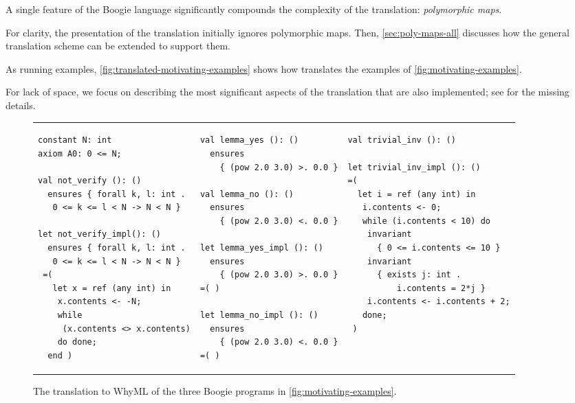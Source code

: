 \documentclass[a4paper,final]{llncs}
\newif\iflong
\newcommand{\Boogie}{Boogie\xspace}
\newcommand{\WhyML}{WhyML\xspace}
\newcommand{\Why}{Why3\xspace}
\begin{document}
A single feature of the \Boogie language significantly compounds the complexity of the translation: \emph{polymorphic maps}\iflong, which correspond to mappings between domains of generic type\fi.
\iflong
\Why does support polymorphic maps through a library, but its type system is more restrictive and does not allow the same degree of freedom as \Boogie's in using variables of polymorphic map types.
\fi
For clarity, the presentation of the translation initially ignores polymorphic maps.
Then, \autoref{sec:poly-maps-all} discusses how the general translation scheme can be extended to support them.

As running examples, \autoref{fig:translated-motivating-examples} shows how  translates the examples of \autoref{fig:motivating-examples}. 
\iflong
\else
For lack of space, we focus on describing the most significant aspects of the translation that are also implemented; see \cite{extended-version} for the missing details.
\fi

\begin{figure}[!tb]
\centering
\scriptsize
\lstset{language=why3,xleftmargin=0pt}
\begin{tabular}{p{} p{} p{}}
{\begin{lstlisting}
constant N: int
axiom A0: 0 <= N;

val not_verify (): ()
  ensures { forall k, l: int .
   0 <= k <= l < N -> N < N }

let not_verify_impl(): ()
  ensures { forall k, l: int .
   0 <= k <= l < N -> N < N }
 =(
   let x = ref (any int) in
    x.contents <- -N;
    while 
     (x.contents <> x.contents)
    do done;
  end )\end{lstlisting}}
&
{\begin{lstlisting}
val lemma_yes (): ()
  ensures
    { (pow 2.0 3.0) >. 0.0 }

val lemma_no (): ()
  ensures
    { (pow 2.0 3.0) <. 0.0 }

let lemma_yes_impl (): ()
  ensures
    { (pow 2.0 3.0) >. 0.0 }
=( )

let lemma_no_impl (): ()
  ensures
    { (pow 2.0 3.0) <. 0.0 }
=( )\end{lstlisting}}
&
{\begin{lstlisting}
val trivial_inv (): ()

let trivial_inv_impl (): ()
=(
  let i = ref (any int) in
   i.contents <- 0;
   while (i.contents < 10) do
    invariant
      { 0 <= i.contents <= 10 }
    invariant
      { exists j: int . 
          i.contents = 2*j }
    i.contents <- i.contents + 2;
   done;
 )\end{lstlisting}}
\end{tabular}
\caption{The translation to \WhyML of the three \Boogie programs in \autoref{fig:motivating-examples}. \iflong(Boilerplate such as general declarations, imports, and frame condition checking are omitted for clarity.)\fi}
\label{fig:translated-motivating-examples}
\end{figure}
\end{document}
